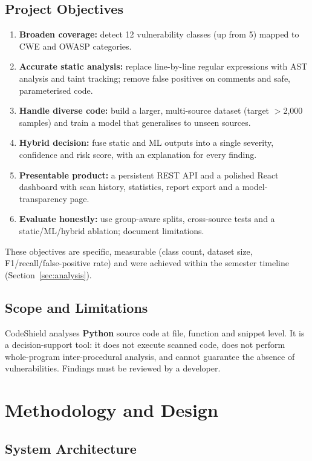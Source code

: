 \documentclass[11pt,a4paper,twoside]{report}
\begin{document}
\section{Project Objectives}
\begin{enumerate}[noitemsep]
  \item \textbf{Broaden coverage:} detect 12 vulnerability classes (up from 5) mapped to CWE and OWASP categories.
  \item \textbf{Accurate static analysis:} replace line-by-line regular expressions with AST analysis and taint tracking; remove false positives on comments and safe, parameterised code.
  \item \textbf{Handle diverse code:} build a larger, multi-source dataset (target $>$2{,}000 samples) and train a model that generalises to unseen sources.
  \item \textbf{Hybrid decision:} fuse static and ML outputs into a single severity, confidence and risk score, with an explanation for every finding.
  \item \textbf{Presentable product:} a persistent REST API and a polished React dashboard with scan history, statistics, report export and a model-transparency page.
  \item \textbf{Evaluate honestly:} use group-aware splits, cross-source tests and a static/ML/hybrid ablation; document limitations.
\end{enumerate}
These objectives are specific, measurable (class count, dataset size, F1/recall/false-positive rate) and were achieved within the semester timeline (Section~\ref{sec:analysis}).

\section{Scope and Limitations}
CodeShield analyses \textbf{Python} source code at file, function and snippet level. It is a decision-support tool: it does not execute scanned code, does not perform whole-program inter-procedural analysis, and cannot guarantee the absence of vulnerabilities. Findings must be reviewed by a developer.

\chapter{Methodology and Design}

\section{System Architecture}
\end{document}
